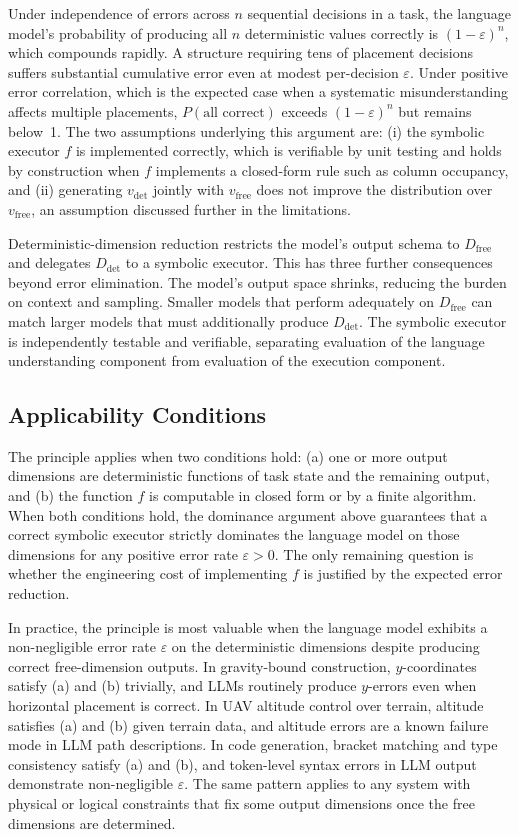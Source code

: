 \documentclass[10pt]{article}
\begin{document}
Under independence of errors across $n$ sequential decisions in a task,
the language model's probability of producing all $n$ deterministic values
correctly is $(1-\varepsilon)^n$, which compounds rapidly. A structure
requiring tens of placement decisions suffers substantial cumulative error
even at modest per-decision $\varepsilon$. Under positive error
correlation, which is the expected case when a systematic misunderstanding
affects multiple placements, $P(\text{all correct})$ exceeds
$(1-\varepsilon)^n$ but remains below~1. The two assumptions underlying
this argument are: (i) the symbolic executor $f$ is implemented correctly,
which is verifiable by unit testing and holds by construction when $f$
implements a closed-form rule such as column occupancy, and (ii) generating
$v_{\mathrm{det}}$ jointly with $v_{\mathrm{free}}$ does not improve the
distribution over $v_{\mathrm{free}}$, an assumption discussed further in
the limitations.

Deterministic-dimension reduction restricts the model's output schema to
$D_{\mathrm{free}}$ and delegates $D_{\mathrm{det}}$ to a symbolic
executor. This has three further consequences beyond error elimination.
The model's output space shrinks, reducing the burden on context and
sampling. Smaller models that perform adequately on $D_{\mathrm{free}}$
can match larger models that must additionally produce $D_{\mathrm{det}}$.
The symbolic executor is independently testable and verifiable, separating
evaluation of the language understanding component from evaluation of the
execution component.

\subsection{Applicability Conditions}

The principle applies when two conditions hold: (a) one or more output
dimensions are deterministic functions of task state and the remaining
output, and (b) the function $f$ is computable in closed form or by a
finite algorithm. When both conditions hold, the dominance argument above
guarantees that a correct symbolic executor strictly dominates the language
model on those dimensions for any positive error rate $\varepsilon > 0$. The only
remaining question is whether the engineering cost of implementing $f$ is
justified by the expected error reduction.

In practice, the principle is most valuable when the language model
exhibits a non-negligible error rate $\varepsilon$ on the deterministic
dimensions despite producing correct free-dimension outputs. In
gravity-bound construction, $y$-coordinates satisfy (a) and (b) trivially,
and LLMs routinely produce $y$-errors even when horizontal placement is
correct. In UAV altitude control over terrain, altitude satisfies (a) and
(b) given terrain data, and altitude errors are a known failure mode in LLM
path descriptions. In code generation, bracket matching and type
consistency satisfy (a) and (b), and token-level syntax errors in LLM
output demonstrate non-negligible $\varepsilon$. The same pattern applies
to any system with physical or logical constraints that fix some output
dimensions once the free dimensions are determined.
\end{document}
